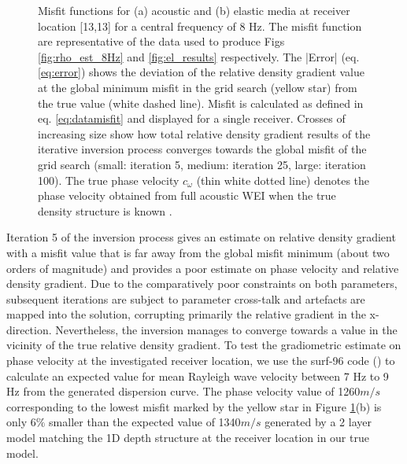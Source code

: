 \documentclass{article}
\begin{document}
\begin{figure}[H]
\begin{subfigure}[c]{0.6\textwidth}
	 	\end{subfigure}
	 	\caption{Misfit functions for (a) acoustic and (b) elastic media at receiver location [13,13] for a central frequency of 8 Hz. The misfit function are representative of the data used to produce Figs \ref{fig:rho_est_8Hz} and \ref{fig:el_results} respectively. The |Error| (eq. \ref{eq:error}) shows the deviation of the relative density gradient value at the global minimum misfit in the grid search (yellow star) from the true value (white dashed line). Misfit is calculated as defined in eq. \eqref{eq:datamisfit} and displayed for a single receiver. Crosses of increasing size show how total relative density gradient results of the iterative inversion process converges towards the global misfit of the grid search (small: iteration 5, medium: iteration 25, large: iteration 100). The true phase velocity $c_{\omega}$ (thin white dotted line) denotes the phase velocity obtained from full acoustic WEI when the true density structure is known .}%
	 	\label{fig:misfit_recLOC_main}
	 \end{figure}
 
	Iteration 5 of the inversion process gives an estimate on relative density gradient with a misfit value that is far away from the global misfit minimum (about two orders of magnitude) and provides a poor estimate on phase velocity and relative density gradient. Due to the comparatively poor constraints on both parameters, subsequent iterations are subject to parameter cross-talk and artefacts are mapped into the solution, corrupting primarily the relative gradient in the x-direction. Nevertheless, the inversion manages to converge towards a value in the vicinity of the true relative density gradient. To test the gradiometric estimate on phase velocity at the investigated receiver location, we use the surf-96 code (\cite{herrman84computer}) to calculate an expected value for mean Rayleigh wave velocity between 7 Hz to 9 Hz from the generated dispersion curve. The phase velocity value of 1260$m/s$ corresponding to the lowest misfit marked by the yellow star in Figure \ref{fig:misfit_recLOC_main}(b) is only 6$\%$ smaller than the expected value of 1340$m/s$ generated by a 2 layer model matching the 1D depth structure at the receiver location in our true model. \\%
	
\end{document}
